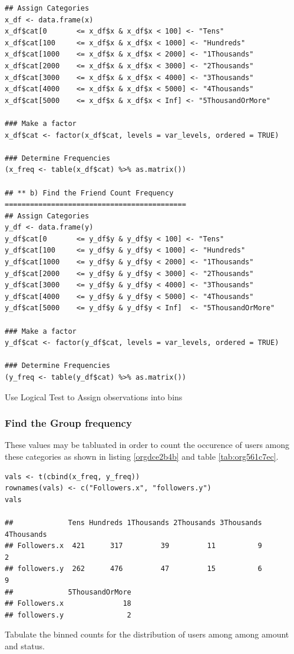 \documentclass[11pt]{article}
\begin{document}
\begin{listing}[htbp]
\begin{verbatim}
## Assign Categories
x_df <- data.frame(x)
x_df$cat[0       <= x_df$x & x_df$x < 100] <- "Tens"
x_df$cat[100     <= x_df$x & x_df$x < 1000] <- "Hundreds"
x_df$cat[1000    <= x_df$x & x_df$x < 2000] <- "1Thousands"
x_df$cat[2000    <= x_df$x & x_df$x < 3000] <- "2Thousands"
x_df$cat[3000    <= x_df$x & x_df$x < 4000] <- "3Thousands"
x_df$cat[4000    <= x_df$x & x_df$x < 5000] <- "4Thousands"
x_df$cat[5000    <= x_df$x & x_df$x < Inf] <- "5ThousandOrMore"

### Make a factor
x_df$cat <- factor(x_df$cat, levels = var_levels, ordered = TRUE)

### Determine Frequencies
(x_freq <- table(x_df$cat) %>% as.matrix())

## ** b) Find the Friend Count Frequency ===========================================
## Assign Categories
y_df <- data.frame(y)
y_df$cat[0       <= y_df$y & y_df$y < 100] <- "Tens"
y_df$cat[100     <= y_df$y & y_df$y < 1000] <- "Hundreds"
y_df$cat[1000    <= y_df$y & y_df$y < 2000] <- "1Thousands"
y_df$cat[2000    <= y_df$y & y_df$y < 3000] <- "2Thousands"
y_df$cat[3000    <= y_df$y & y_df$y < 4000] <- "3Thousands"
y_df$cat[4000    <= y_df$y & y_df$y < 5000] <- "4Thousands"
y_df$cat[5000    <= y_df$y & y_df$y < Inf]  <- "5ThousandOrMore"

### Make a factor
y_df$cat <- factor(y_df$cat, levels = var_levels, ordered = TRUE)

### Determine Frequencies
(y_freq <- table(y_df$cat) %>% as.matrix())
\end{verbatim}
\caption{\label{orgafa6c79}Use Logical Test to Assign observations into bins}
\end{listing}

\subsubsection{Find the Group frequency}
\label{sec:org31dfaf2}
These values may be tabluated in order to count the occurence of users among these categories as shown in listing \ref{orgdce2b4b} and table \ref{tab:org561c7ec}.

\begin{listing}[htbp]
\begin{verbatim}
vals <- t(cbind(x_freq, y_freq))
rownames(vals) <- c("Followers.x", "followers.y")
vals

##             Tens Hundreds 1Thousands 2Thousands 3Thousands 4Thousands
## Followers.x  421      317         39         11          9          2
## followers.y  262      476         47         15          6          9
##             5ThousandOrMore
## Followers.x              18
## followers.y               2
\end{verbatim}
\caption{\label{orgdce2b4b}Tabulate the binned counts for the distribution of users among among amount and status.}
\end{listing}
\end{document}
